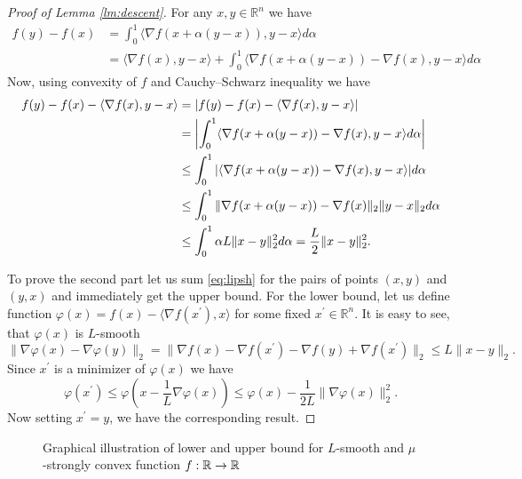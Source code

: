 \begin{proof}[Proof of Lemma \ref{lm:descent}]
   For any $x,y\in\mathbb{R}^n$ we have
   \begin{align}
        f(y) - f(x)  &= \int_0^1\langle\nabla f(x + \alpha(y-x)), y-x\rangle d\alpha\nonumber\\
         &= \langle \nabla f(x), y-x\rangle + \int_0^1\langle\nabla f(x + \alpha(y-x)) - \nabla f(x), y-x\rangle d\alpha
   \end{align}
Now, using  convexity of $f$ and Cauchy–Schwarz inequality we have
\begin{align}\label{eq:lipsh}
    f(y)-f(x) - \langle \nabla f(x), y-x\rangle &= |f(y)-f(x) - \langle \nabla f(x), y-x\rangle|\nonumber\\ &= \left|\int_0^1\langle\nabla f(x + \alpha(y-x)) - \nabla f(x), y-x\rangle d\alpha\right|\nonumber\\
 &\leq \int_0^1|\langle\nabla f(x + \alpha(y-x)) - \nabla f(x), y-x\rangle| d\alpha\nonumber\\
&\leq\int_0^1\|\nabla f(x + \alpha(y-x)) - \nabla f(x)\|_2\|y-x\|_2 d\alpha\nonumber\\
&\leq \int_0^1{\alpha} L\|x-y\|_2^2 d{\alpha} = \frac{L}{2}\|x-y\|_2^2.
\end{align}

To prove the second part let us sum \eqref{eq:lipsh} for the pairs of points $(x,y)$ and $(y,x)$ and immediately get the upper bound.
For the lower bound, let us define function $\varphi(x)  = f(x) - \langle \nabla f(x^\prime), x\rangle$ for some fixed $x^\prime\in\mathbb{R}^n$.
It is easy to see, that $\varphi(x)$ is $L$-smooth
$$
\|\nabla\varphi(x) - \nabla\varphi(y)\|_2 = \|\nabla f(x) - \nabla f(x^\prime) - \nabla f(y) + \nabla f(x^\prime)\|_2\leq L\|x-y\|_2.
$$
Since $x^\prime$ is a minimizer of $\varphi(x)$ we have
\begin{equation}
\varphi(x^\prime) \leq \varphi(x - \frac{1}{L}\nabla \varphi(x))\leq \varphi(x) - \frac{1}{2L}\|\nabla \varphi(x)\|_2^2. 
\end{equation}
Now setting $x^\prime = y$, we have the corresponding result.
\end{proof}

\begin{figure}[H]
\centering

\caption{Graphical illustration of lower and upper bound for $L$-smooth and $\mu$-strongly convex function $f:\mathbb{R}\rightarrow \mathbb{R}$}
\label{fig:functional_approximations}
\end{figure}

